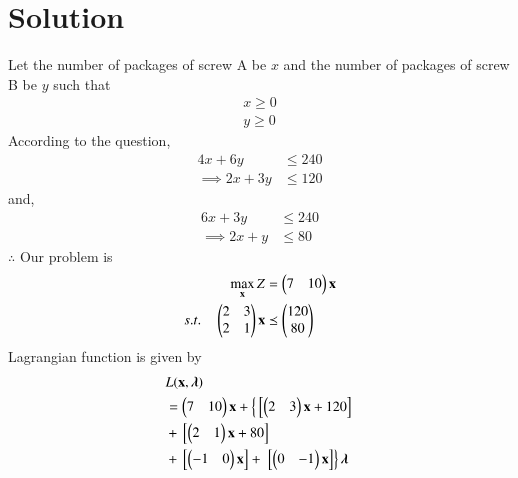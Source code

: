 \documentclass[journal,12pt,twocolumn]{IEEEtran}
\begin{document}
\section{Solution}
\begin{table}[!ht]
\centering
{}
\caption{Screw Requirements}
\label{tab:table1}
\end{table}
Let the number of packages of screw  A be $x$ and the number of packages of screw B be $y$  such that 
\begin{align}
    x \geq 0 \\
    y \geq 0 
\end{align}
According to the question,
\begin{align}
    4x+6y &\leq 240 \\
 \implies 2x+3y &\leq 120
\end{align}
     and,
\begin{align}
    6x+3y &\leq 240 \\
 \implies 2x+y &\leq 80
\end{align}
$\therefore$ Our problem is
\begin{align}
        \max_{\mathbf{x}} Z &= \begin{pmatrix}7 & 10\end{pmatrix}\mathbf{x}\\
        s.t. \quad 
        \begin{pmatrix}2 & 3 \\ 2 & 1 \end{pmatrix}\mathbf{x} &\preceq \begin{pmatrix}120\\80\end{pmatrix} 
\end{align}
Lagrangian function is given by
\begin{equation}
\begin{aligned}
    &L(\mathbf{x},\boldsymbol{\lambda}) \\ &= \begin{pmatrix}7 & 10\end{pmatrix}\mathbf{x}+\left\{{}\left[\begin{pmatrix}2 & 3\end{pmatrix}\mathbf{x}+120\right]\right. \\ &+ {}\left[\begin{pmatrix}2 & 1\end{pmatrix}\mathbf{x}+80\right] \\ &+ {}\left[\begin{pmatrix}-1 & 0\end{pmatrix}\mathbf{x}\right] +\left.{}\left[\begin{pmatrix}0 & -1\end{pmatrix}\mathbf{x}\right]\right\}\boldsymbol{\lambda}
\end{aligned}
\end{equation}
\end{document}
